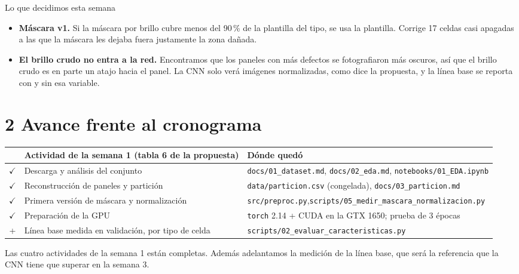 \documentclass[11pt,a4paper]{article}
\newcommand{\hecho}{{\color{okc}$\checkmark$}}
\begin{document}
\begin{decision}{Lo que decidimos esta semana}
\begin{itemize}[leftmargin=12pt]
  \item \textbf{Máscara v1.} Si la máscara por brillo cubre menos del 90\,\% de la plantilla del tipo, se usa la plantilla.
        Corrige 17 celdas casi apagadas a las que la máscara les dejaba fuera justamente la zona dañada.
  \item \textbf{El brillo crudo no entra a la red.} Encontramos que los paneles con más defectos se fotografiaron más oscuros, así que el brillo crudo
        es en parte un atajo hacia el panel. La CNN solo verá imágenes normalizadas, como dice la propuesta, y la línea base se reporta con y sin esa variable.
\end{itemize}
\end{decision}

\section*{2 \quad Avance frente al cronograma}

\begin{table}[!htbp]
\centering\small
\begin{tabularx}{\textwidth}{@{}c X >{\footnotesize}p{7.6cm}@{}}
\toprule
 & Actividad de la semana 1 (tabla 6 de la propuesta) & Dónde quedó \\
\midrule
\hecho & Descarga y análisis del conjunto & \texttt{docs/01\_dataset.md}, \texttt{docs/02\_eda.md}, \texttt{notebooks/01\_EDA.ipynb} \\
\hecho & Reconstrucción de paneles y partición & \texttt{data/particion.csv} (congelada), \texttt{docs/03\_particion.md} \\
\hecho & Primera versión de máscara y normalización & \texttt{src/preproc.py},\newline \texttt{scripts/05\_medir\_mascara\_normalizacion.py} \\
\hecho & Preparación de la GPU & \texttt{torch} 2.14 + CUDA en la GTX 1650; prueba de 3 épocas \\
\midrule
+ & Línea base medida en validación, por tipo de celda & \texttt{scripts/02\_evaluar\_caracteristicas.py} \\
\bottomrule
\end{tabularx}
\end{table}

Las cuatro actividades de la semana 1 están completas. Además adelantamos la medición de la línea base, que será la referencia que la CNN tiene que superar en la semana 3.
\end{document}
